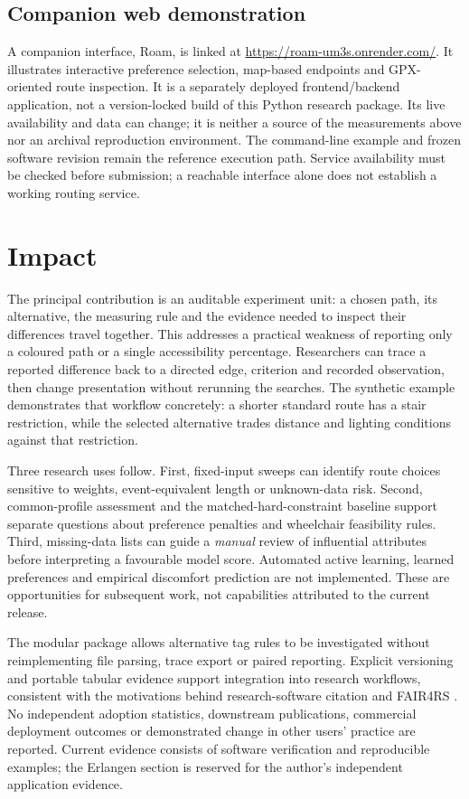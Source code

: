 \documentclass[preprint,12pt,a4paper]{elsarticle}
\begin{document}
\subsection{Companion web demonstration}
\label{sec:webdemo}
A companion interface, Roam, is linked at
\url{https://roam-um3s.onrender.com/}. It illustrates interactive preference
selection, map-based endpoints and GPX-oriented route inspection. It is a
separately deployed frontend/backend application, not a version-locked build
of this Python research package. Its live availability and data can change;
it is neither a source of the measurements above nor an archival reproduction
environment. The command-line example and frozen software revision remain the
reference execution path. Service availability must be checked before
submission; a reachable interface alone does not establish a working routing
service.

\section{Impact}
\label{sec:impact}
The principal contribution is an auditable experiment unit: a chosen path,
its alternative, the measuring rule and the evidence needed to inspect their
differences travel together. This addresses a practical weakness of reporting
only a coloured path or a single accessibility percentage. Researchers can
trace a reported difference back to a directed edge, criterion and recorded
observation, then change presentation without rerunning the searches. The
synthetic example demonstrates that workflow concretely: a shorter standard
route has a stair restriction, while the selected alternative trades distance
and lighting conditions against that restriction.

Three research uses follow. First, fixed-input sweeps can identify route
choices sensitive to weights, event-equivalent length or unknown-data risk.
Second, common-profile assessment and the matched-hard-constraint baseline
support separate questions about preference penalties and wheelchair
feasibility rules. Third, missing-data lists can guide a \emph{manual} review
of influential attributes before interpreting a favourable model score.
Automated active learning, learned preferences and empirical discomfort
prediction are not implemented. These are opportunities for subsequent work,
not capabilities attributed to the current release.

The modular package allows alternative tag rules to be investigated without
reimplementing file parsing, trace export or paired reporting. Explicit
versioning and portable tabular evidence support integration into research
workflows, consistent with the motivations behind research-software citation
and FAIR4RS \cite{smith2016,barker2022}. No independent adoption statistics,
downstream publications, commercial deployment outcomes or demonstrated
change in other users' practice are reported. Current evidence consists of
software verification and reproducible examples; the Erlangen section is
reserved for the author's independent application evidence.
\end{document}
